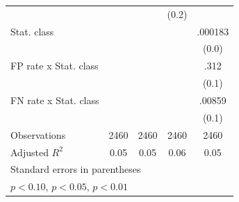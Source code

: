 \begin{table}[htbp]
\begin{tabular}{l*{4}{c}}
                &                  &                  &    (0.2)         &                  \\
Stat. class     &                  &                  &                  &  .000183         \\
                &                  &                  &                  &    (0.0)         \\
FP rate x Stat. class&                  &                  &                  &     .312\sym{***}\\
                &                  &                  &                  &    (0.1)         \\
FN rate x Stat. class&                  &                  &                  &   .00859         \\
                &                  &                  &                  &    (0.1)         \\
\hline
Observations    &     2460         &     2460         &     2460         &     2460         \\
Adjusted \(R^{2}\)&     0.05         &     0.05         &     0.06         &     0.05         \\
\hline\hline
\multicolumn{5}{l}{\footnotesize Standard errors in parentheses}\\
\multicolumn{5}{l}{\footnotesize \sym{*} \(p<0.10\), \sym{**} \(p<0.05\), \sym{***} \(p<0.01\)}\\
\end{tabular}
\end{table}
